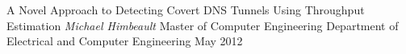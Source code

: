 \documentclass[dvips,12pt]{report}
\begin{document}

\thesistitle
	{A Novel Approach to Detecting Covert DNS Tunnels Using Throughput Estimation}
	{\emph{Michael Himbeault}}
	{Master of Computer Engineering}
	{Department of Electrical and Computer Engineering}
	{May 2012}
















\appendix

\end{document}
